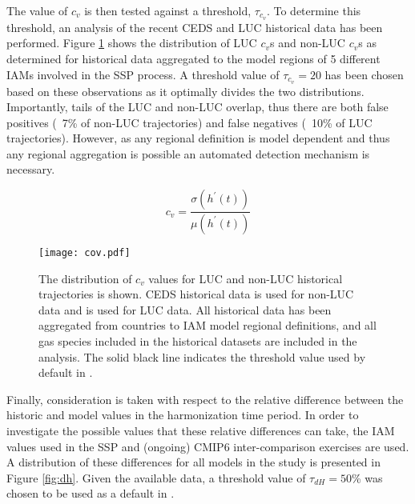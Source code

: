The value of $c_v$ is then tested against a threshold, $\tau_{c_v}$. To
determine this threshold, an analysis of the recent CEDS and LUC historical data
has been performed. Figure \ref{fig:cov} shows the distribution of LUC $c_v$s
and non-LUC $c_v$s as determined for historical data aggregated to the model
regions of 5 different IAMs involved in the SSP process. A threshold value of
$\tau_{c_v} = 20$ has been chosen based on these observations as it
optimally divides the two distributions. Importantly, tails of the LUC and
non-LUC overlap, thus there are both false positives (~7\% of non-LUC
trajectories) and false negatives (~10\% of LUC trajectories). However, as any
regional definition is model dependent and thus any regional aggregation is
possible an automated detection mechanism is necessary.

\begin{equation}\label{eqs:cov}
% 
% 
    c_v =  \frac{\sigma(h^{\prime}(t))}{\mu(h^{\prime}(t))}
\end{equation}


\begin{figure}
  \begin{center}
    \texttt{[image: cov.pdf]}
    \caption[]{
      \label{fig:cov}
      The distribution of $c_v$ values for LUC and non-LUC historical
      trajectories is shown. CEDS historical data \cite{hoesly_historical_2017}
      is used for non-LUC data and \cite{van_marle_historic_2017} is used for
      LUC data. All historical data has been aggregated from countries to IAM
      model regional definitions, and all gas species included in the historical
      datasets are included in the analysis. The solid black line indicates the
      threshold value used by default in .  }
  \end{center}
\end{figure}

Finally, consideration is taken with respect to the relative difference between
the historic and model values in the harmonization time period. In order to
investigate the possible values that these relative differences can take, the
IAM values used in the SSP and (ongoing) CMIP6 inter-comparison
exercises are used. A distribution of these differences for all models in the
study is presented in Figure \ref{fig:dh}. Given the available data, a threshold
value of $\tau_{dH} = 50$\% was chosen to be used as a default in .
% 
% 

